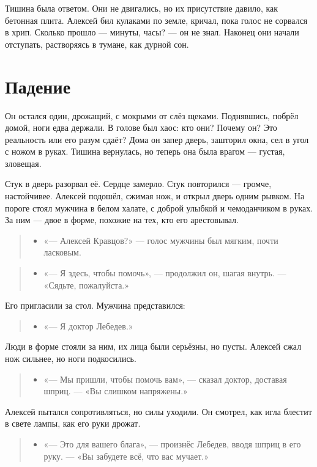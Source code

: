 \documentclass[12pt,a4paper]{book}
\newenvironment{dialogue}{\begin{quote}\itshape\begin{itemize}\item[]}{\end{itemize}\end{quote}}
\begin{document}
Тишина была ответом. Они не двигались, но их присутствие давило, как бетонная плита. Алексей бил кулаками по земле, кричал, пока голос не сорвался в хрип. Сколько прошло — минуты, часы? — он не знал. Наконец они начали отступать, растворяясь в тумане, как дурной сон.

\section{Падение}

Он остался один, дрожащий, с мокрыми от слёз щеками. Поднявшись, побрёл домой, ноги едва держали. В голове был хаос: кто они? Почему он? Это реальность или его разум сдаёт? Дома он запер дверь, зашторил окна, сел в угол с ножом в руках. Тишина вернулась, но теперь она была врагом — густая, зловещая.

Стук в дверь разорвал её. Сердце замерло. Стук повторился — громче, настойчивее. Алексей подошёл, сжимая нож, и открыл дверь одним рывком. На пороге стоял мужчина в белом халате, с доброй улыбкой и чемоданчиком в руках. За ним — двое в форме, похожие на тех, кто его арестовывал.

\begin{dialogue}
«— Алексей Кравцов?» — голос мужчины был мягким, почти ласковым.
\end{dialogue}

\begin{dialogue}
«— Я здесь, чтобы помочь», — продолжил он, шагая внутрь. — «Сядьте, пожалуйста.»
\end{dialogue}

Его пригласили за стол. Мужчина представился:

\begin{dialogue}
«— Я доктор Лебедев.»
\end{dialogue}

Люди в форме стояли за ним, их лица были серьёзны, но пусты. Алексей сжал нож сильнее, но ноги подкосились.

\begin{dialogue}
«— Мы пришли, чтобы помочь вам», — сказал доктор, доставая шприц. — «Вы слишком напряжены.»
\end{dialogue}

Алексей пытался сопротивляться, но силы уходили. Он смотрел, как игла блестит в свете лампы, как его руки дрожат.

\begin{dialogue}
«— Это для вашего блага», — произнёс Лебедев, вводя шприц в его руку. — «Вы забудете всё, что вас мучает.»
\end{dialogue}
\end{document}
